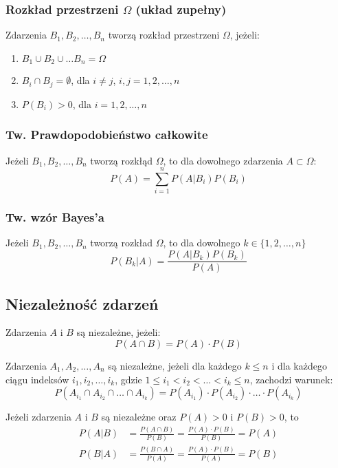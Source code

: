 \documentclass[../Matematyka.tex]{subfiles}
\begin{document}
\subsubsection*{Rozkład przestrzeni \(\Omega\) (układ zupełny)}
Zdarzenia \(B_1, B_2, \ldots, B_n\) tworzą rozkład przestrzeni \(\Omega\), jeżeli:
\begin{enumerate}[label=(\roman*)]
    \item \(B_1 \cup B_2 \cup \dots B_n = \Omega\)
    \item \(B_i \cap B_j = \emptyset\), dla \(i \neq j\), \(i,j = 1,2,\ldots,n\)
    \item \(P(B_i) > 0\), dla \(i = 1,2,\ldots,n\)
\end{enumerate}

\subsubsection*{Tw. Prawdopodobieństwo całkowite}
Jeżeli \(B_1, B_2, \ldots, B_n\) tworzą rozkłąd \(\Omega\), to dla dowolnego zdarzenia \(A \subset \Omega\):
\[P(A) = \sum_{i=1}^{n} P(A|B_i)P(B_i)\]

\subsubsection*{Tw. wzór Bayes'a}
Jeżeli \(B_1, B_2, \ldots, B_n\) tworzą rozkład \(\Omega\), to dla dowolnego \(k \in \{1, 2, \ldots, n\}\)
\[P(B_k|A) = \frac{P(A|B_k)P(B_k)}{P(A)}\]

\subsection{Niezależność zdarzeń}
Zdarzenia \(A\) i \(B\) są niezależne, jeżeli:
\[P(A \cap B) = P(A) \cdot P(B)\]

Zdarzenia \(A_1, A_2, \ldots, A_n\) są niezależne, jeżeli dla każdego \(k \leq n\) i dla każdego ciągu indeksów \(i_1, i_2, \ldots, i_k\),
gdzie \(1 \leq i_1 < i_2 < \dots < i_k \leq n\), zachodzi warunek:
\[P(A_{i_1} \cap A_{i_2} \cap \ldots \cap A_{i_k}) = P(A_{i_1}) \cdot P(A_{i_2}) \cdot \ldots \cdot P(A_{i_k})\]

Jeżeli zdarzenia \(A\) i \(B\) są niezależne oraz \(P(A) > 0\) i \(P(B) > 0\), to
\begin{align*}
    P(A|B) & = \frac{P(A \cap B)}{P(B)} = \frac{P(A) \cdot P(B)}{P(B)} = P(A) \\
    P(B|A) & = \frac{P(B \cap A)}{P(A)} = \frac{P(A) \cdot P(B)}{P(A)} = P(B)
\end{align*}
\end{document}

